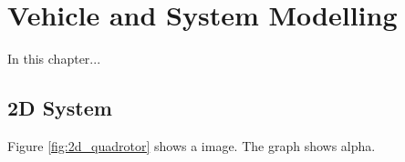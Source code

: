 \chapter{Vehicle and System Modelling} \label{seq:dynamics}

In this chapter...


\section{2D System} \label{sec:dynamicmodel}

Figure \ref{fig:2d_quadrotor} shows a image. The graph shows \ac{alpha}.

\def\iangle{-20} %
